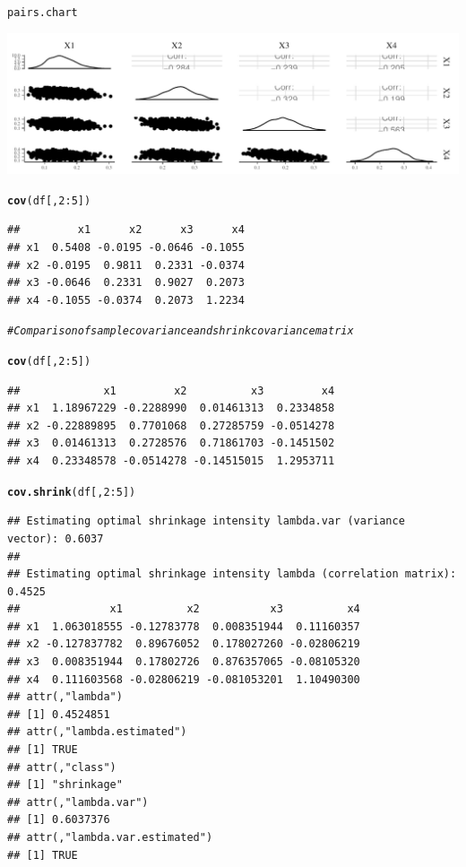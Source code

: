 \documentclass[11pt,a4paper,twoside]{book}
\makeatletter
\def\maxwidth{ %
  \ifdim\Gin@nat@width>\linewidth
    \linewidth
  \else
    \Gin@nat@width
  \fi
}
\newcommand{\hlnum}[1]{\textcolor[rgb]{0.686,0.059,0.569}{#1}}%
\newcommand{\hlcom}[1]{\textcolor[rgb]{0.678,0.584,0.686}{\textit{#1}}}%
\newcommand{\hlopt}[1]{\textcolor[rgb]{0,0,0}{#1}}%
\newcommand{\hlstd}[1]{\textcolor[rgb]{0.345,0.345,0.345}{#1}}%
\newcommand{\hlkwd}[1]{\textcolor[rgb]{0.737,0.353,0.396}{\textbf{#1}}}%
\newenvironment{kframe}{%
 \def\at@end@of@kframe{}%
 \ifinner\ifhmode%
  \def\at@end@of@kframe{\end{minipage}}%
  \begin{minipage}{\columnwidth}%
 \fi\fi%
 \def\FrameCommand##1{\hskip\@totalleftmargin \hskip-\fboxsep
 \colorbox{shadecolor}{##1}\hskip-\fboxsep
     \hskip-\linewidth \hskip-\@totalleftmargin \hskip\columnwidth}%
 \MakeFramed {\advance\hsize-\width
   \@totalleftmargin\z@ \linewidth\hsize
   \@setminipage}}%
 {\par\unskip\endMakeFramed%
 \at@end@of@kframe}
\newenvironment{knitrout}{}{} %
\makeatother
\begin{document}
\begin{knitrout}
\begin{kframe}
\begin{alltt}
\hlstd{pairs.chart}
\end{alltt}
\end{kframe}
\includegraphics[width=\maxwidth]{figure/ch03_figcovuncertainty-1} 
\begin{kframe}\begin{alltt}
\hlkwd{cov}\hlstd{(df[,}\hlnum{2}\hlopt{:}\hlnum{5}\hlstd{])}
\end{alltt}
\begin{verbatim}
##         x1      x2      x3      x4
## x1  0.5408 -0.0195 -0.0646 -0.1055
## x2 -0.0195  0.9811  0.2331 -0.0374
## x3 -0.0646  0.2331  0.9027  0.2073
## x4 -0.1055 -0.0374  0.2073  1.2234
\end{verbatim}
\end{kframe}
\end{knitrout}

\begin{knitrout}
\color{fgcolor}\begin{kframe}
\begin{alltt}
\hlcom{#Comparison of sample covariance and shrink covariance matrix}

\hlkwd{cov}\hlstd{(df[,}\hlnum{2}\hlopt{:}\hlnum{5}\hlstd{])}
\end{alltt}
\begin{verbatim}
##             x1         x2          x3         x4
## x1  1.18967229 -0.2288990  0.01461313  0.2334858
## x2 -0.22889895  0.7701068  0.27285759 -0.0514278
## x3  0.01461313  0.2728576  0.71861703 -0.1451502
## x4  0.23348578 -0.0514278 -0.14515015  1.2953711
\end{verbatim}
\begin{alltt}
\hlkwd{cov.shrink}\hlstd{(df[,}\hlnum{2}\hlopt{:}\hlnum{5}\hlstd{])}
\end{alltt}
\begin{verbatim}
## Estimating optimal shrinkage intensity lambda.var (variance vector): 0.6037 
## 
## Estimating optimal shrinkage intensity lambda (correlation matrix): 0.4525
##              x1          x2           x3          x4
## x1  1.063018555 -0.12783778  0.008351944  0.11160357
## x2 -0.127837782  0.89676052  0.178027260 -0.02806219
## x3  0.008351944  0.17802726  0.876357065 -0.08105320
## x4  0.111603568 -0.02806219 -0.081053201  1.10490300
## attr(,"lambda")
## [1] 0.4524851
## attr(,"lambda.estimated")
## [1] TRUE
## attr(,"class")
## [1] "shrinkage"
## attr(,"lambda.var")
## [1] 0.6037376
## attr(,"lambda.var.estimated")
## [1] TRUE
\end{verbatim}
\end{kframe}
\end{knitrout}
\end{document}
